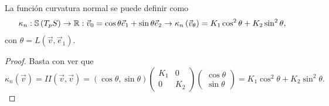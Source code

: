 \begin{colorary}
La función curvatura normal se puede definir como
\[\kappa_{n} : \mathbb{S}\left(T_{p}S\right)\to \mathbb{R} : \vec{v}_{0}=\cos \theta \vec{e}_{1} + \sin \theta \vec{e}_{2} \to \kappa_{n}\left(\vec{v}_{\theta }\right)=K_{1}\cos ^{2}\theta + K_{2}\sin ^{2}\theta ,\]
con $\displaystyle \theta = L\left(\vec{v}, \vec{e}_{1}\right) $. 
\end{colorary}
\begin{proof}
Basta con ver que 
\[\kappa_{n}\left(\vec{v}\right)=II\left(\vec{v}, \vec{v}\right)= \left(\cos \theta , \sin \theta \right)\begin{pmatrix} K_{1} & 0 \\ 0 & K_{2} \end{pmatrix}\begin{pmatrix} \cos \theta \\ \sin \theta  \end{pmatrix}= K_{1} \cos ^{2}\theta + K_{2}\sin ^{2}\theta  .\]
\end{proof}
